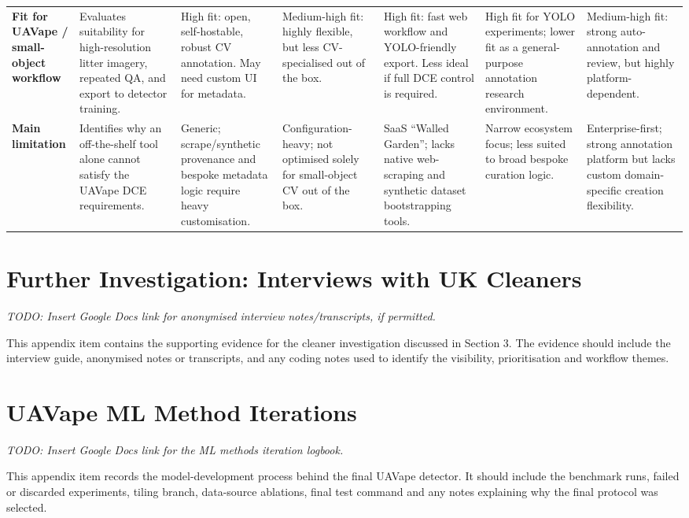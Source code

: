 \begin{landscape}
\begin{longtable}{@{}Y{0.10\linewidth}Y{0.15\linewidth}Y{0.15\linewidth}Y{0.15\linewidth}Y{0.15\linewidth}Y{0.15\linewidth}Y{0.15\linewidth}@{}}
\textbf{Fit for UAVape / small-object workflow} &
Evaluates suitability for high-resolution litter imagery, repeated QA, and export to detector training. &
High fit: open, self-hostable, robust CV annotation. May need custom UI for metadata. &
Medium-high fit: highly flexible, but less CV-specialised out of the box. &
High fit: fast web workflow and YOLO-friendly export. Less ideal if full DCE control is required. &
High fit for YOLO experiments; lower fit as a general-purpose annotation research environment. &
Medium-high fit: strong auto-annotation and review, but highly platform-dependent. \\

\textbf{Main limitation} &
Identifies why an off-the-shelf tool alone cannot satisfy the UAVape DCE requirements. &
Generic; scrape/synthetic provenance and bespoke metadata logic require heavy customisation. &
Configuration-heavy; not optimised solely for small-object CV out of the box. &
SaaS ``Walled Garden''; lacks native web-scraping and synthetic dataset bootstrapping tools. &
Narrow ecosystem focus; less suited to broad bespoke curation logic. &
Enterprise-first; strong annotation platform but lacks custom domain-specific creation flexibility. \\

\end{longtable}
\end{landscape}
\normalsize

\section{Further Investigation: Interviews with UK Cleaners}
\label{app:cleaner_interviews}
\textit{TODO: Insert Google Docs link for anonymised interview notes/transcripts, if permitted.}

This appendix item contains the supporting evidence for the cleaner investigation discussed in Section 3. The evidence should include the interview guide, anonymised notes or transcripts, and any coding notes used to identify the visibility, prioritisation and workflow themes.

\section{UAVape ML Method Iterations}
\label{appendix:uavape_ml_method_iterations}
\textit{TODO: Insert Google Docs link for the ML methods iteration logbook.}

This appendix item records the model-development process behind the final UAVape detector. It should include the benchmark runs, failed or discarded experiments, tiling branch, data-source ablations, final test command and any notes explaining why the final protocol was selected.

